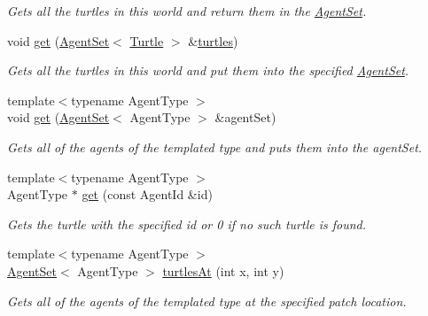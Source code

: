\begin{DoxyCompactItemize}
\begin{DoxyCompactList}\small\item\em Gets all the turtles in this world and return them in the \hyperlink{classrepast_1_1relogo_1_1_agent_set}{Agent\-Set}. \end{DoxyCompactList}\item 
void \hyperlink{classrepast_1_1relogo_1_1_observer_aecb694175ac25b641ab39fdf66a1d865}{get} (\hyperlink{classrepast_1_1relogo_1_1_agent_set}{Agent\-Set}$<$ \hyperlink{classrepast_1_1relogo_1_1_turtle}{Turtle} $>$ \&\hyperlink{classrepast_1_1relogo_1_1_observer_a801236adc73230ae18d3f52c88462c16}{turtles})
\begin{DoxyCompactList}\small\item\em Gets all the turtles in this world and put them into the specified \hyperlink{classrepast_1_1relogo_1_1_agent_set}{Agent\-Set}. \end{DoxyCompactList}\item 
{\footnotesize template$<$typename Agent\-Type $>$ }\\void \hyperlink{classrepast_1_1relogo_1_1_observer_a895df31674a579f8eb506cf76cfc1dba}{get} (\hyperlink{classrepast_1_1relogo_1_1_agent_set}{Agent\-Set}$<$ Agent\-Type $>$ \&agent\-Set)
\begin{DoxyCompactList}\small\item\em Gets all of the agents of the templated type and puts them into the agent\-Set. \end{DoxyCompactList}\item 
{\footnotesize template$<$typename Agent\-Type $>$ }\\Agent\-Type $\ast$ \hyperlink{classrepast_1_1relogo_1_1_observer_a7251d8ec999c10df60cbe55b45f84e16}{get} (const Agent\-Id \&id)
\begin{DoxyCompactList}\small\item\em Gets the turtle with the specified id or 0 if no such turtle is found. \end{DoxyCompactList}\item 
{\footnotesize template$<$typename Agent\-Type $>$ }\\\hyperlink{classrepast_1_1relogo_1_1_agent_set}{Agent\-Set}$<$ Agent\-Type $>$ \hyperlink{classrepast_1_1relogo_1_1_observer_a8d1157c42f9ae822860e9865cb871741}{turtles\-At} (int x, int y)
\begin{DoxyCompactList}\small\item\em Gets all of the agents of the templated type at the specified patch location. \end{DoxyCompactList}\item 

\end{DoxyCompactItemize}
